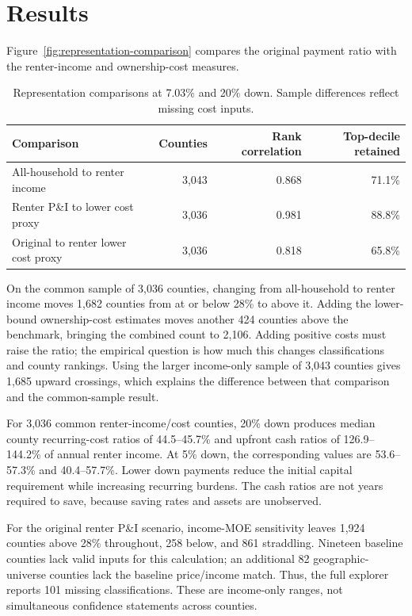 \documentclass[conference,letterpaper]{IEEEtran}
\begin{document}
\section{Results}
Figure~\ref{fig:representation-comparison} compares the original payment ratio with the renter-income and ownership-cost measures.
\begin{table}[t]
\caption{Representation comparisons at 7.03\% and 20\% down. Sample differences reflect missing cost inputs.}
\centering\small
\begin{tabular}{lrrr}\toprule
Comparison & Counties & Rank correlation & Top-decile retained\\\midrule
All-household to renter income & 3,043 & 0.868 & 71.1\%\\
Renter P\&I to lower cost proxy & 3,036 & 0.981 & 88.8\%\\
Original to renter lower cost proxy & 3,036 & 0.818 & 65.8\%\\\bottomrule
\end{tabular}
\end{table}
On the common sample of 3,036 counties, changing from all-household to renter income moves 1,682 counties from at or below 28\% to above it. Adding the lower-bound ownership-cost estimates moves another 424 counties above the benchmark, bringing the combined count to 2,106. Adding positive costs must raise the ratio; the empirical question is how much this changes classifications and county rankings. Using the larger income-only sample of 3,043 counties gives 1,685 upward crossings, which explains the difference between that comparison and the common-sample result.

For 3,036 common renter-income/cost counties, 20\% down produces median county recurring-cost ratios of 44.5--45.7\% and upfront cash ratios of 126.9--144.2\% of annual renter income. At 5\% down, the corresponding values are 53.6--57.3\% and 40.4--57.7\%. Lower down payments reduce the initial capital requirement while increasing recurring burdens. The cash ratios are not years required to save, because saving rates and assets are unobserved.

For the original renter P\&I scenario, income-MOE sensitivity leaves 1,924 counties above 28\% throughout, 258 below, and 861 straddling. Nineteen baseline counties lack valid inputs for this calculation; an additional 82 geographic-universe counties lack the baseline price/income match. Thus, the full explorer reports 101 missing classifications. These are income-only ranges, not simultaneous confidence statements across counties.
\end{document}
